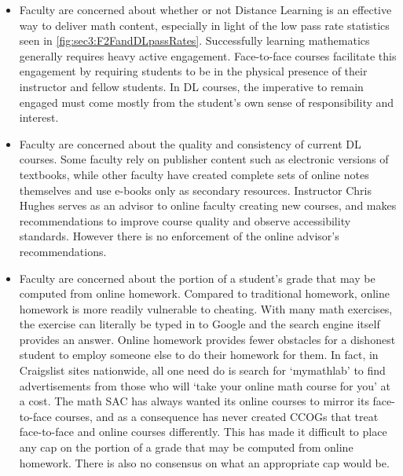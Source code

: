 \begin{itemize}
\item Faculty are concerned about whether or not Distance Learning is an effective way to deliver math content, especially in light of the low pass rate statistics seen in \cref{fig:sec3:F2FandDLpassRates}. Successfully learning mathematics generally requires heavy active engagement. Face-to-face courses facilitate this engagement by requiring students to be in the physical presence of their instructor and fellow students. In DL courses, the imperative to remain engaged must come mostly from the student's own sense of responsibility and interest.
\item Faculty are concerned about the quality and consistency of current DL courses. Some faculty rely on publisher content such as electronic versions of textbooks, while other faculty have created complete sets of online notes themselves and use e-books only as secondary resources. Instructor Chris Hughes serves as an advisor to online faculty creating new courses, and makes recommendations to improve course quality and observe accessibility standards. However there is no enforcement of the online advisor's recommendations.
\item Faculty are concerned about the portion of a student's grade that may be computed from online homework. Compared to traditional homework, online homework is more readily vulnerable to cheating. With many math exercises, the exercise can literally be typed in to Google and the search engine itself provides an answer. Online homework provides fewer obstacles for a dishonest student to employ someone else to do their homework for them. In fact, in Craigslist sites nationwide, all one need do is search for `mymathlab' to find advertisements from those who will `take your online math course for you' at a cost. The math SAC has always wanted its online courses to mirror its face-to-face courses, and as a consequence has never created CCOGs that treat face-to-face and online courses differently. This has made it difficult to place any cap on the portion of a grade that may be computed from online homework. There is also no consensus on what an appropriate cap would be.
\end{itemize}

